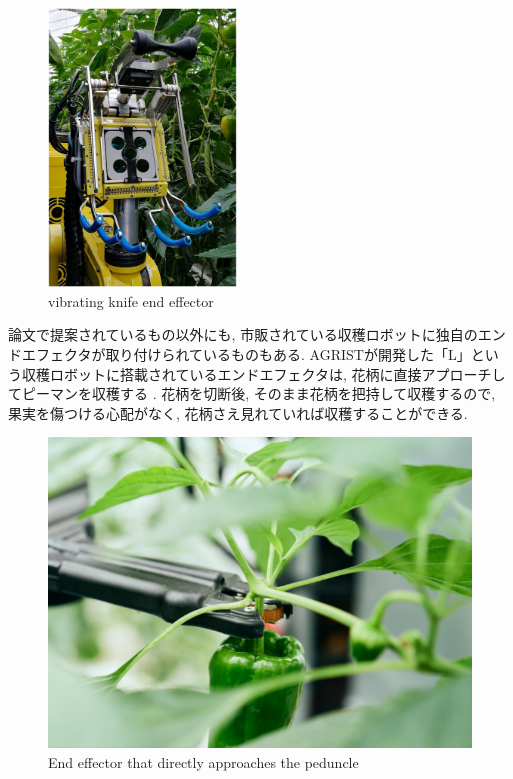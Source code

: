 \vspace{5mm}
\begin{figure}[H]
     \centering
     \includegraphics[width=50mm]{images/png/sweeper.png}
     \caption{vibrating knife end effector}
     \label{Fig:sweeper}
   \end{figure}

論文で提案されているもの以外にも, 市販されている収穫ロボットに独自のエンドエフェクタが取り付けられているものもある.
AGRISTが開発した「L」という収穫ロボットに搭載されているエンドエフェクタは, 花柄に直接アプローチしてピーマンを収穫する \cite{agrist}.
花柄を切断後, そのまま花柄を把持して収穫するので, 果実を傷つける心配がなく, 花柄さえ見れていれば収穫することができる.

\vspace{5mm}
\begin{figure}[H]
     \centering
     \includegraphics[width=130mm]{images/png/agrist.png}
     \caption{End effector that directly approaches the peduncle}
     \label{Fig:agrist}
   \end{figure}

